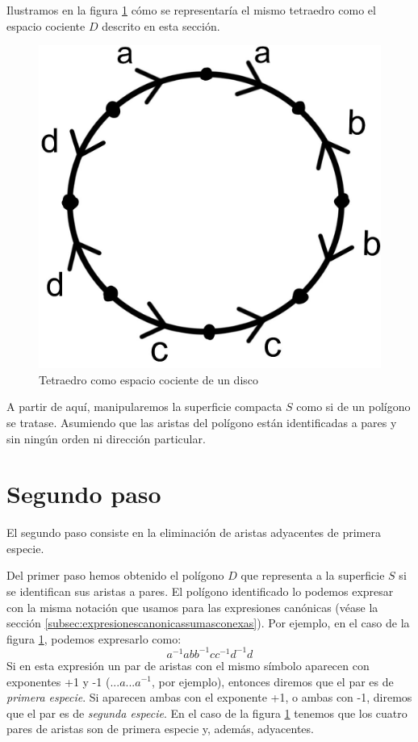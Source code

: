 \documentclass[a4paper,11pt,spanish, twoside, leqno]{tfg-uam}
\theoremstyle{definition}
\begin{document}
Ilustramos en la figura \ref{fig:d} cómo se representaría el mismo tetraedro como el espacio cociente $D$ descrito en esta sección.

\begin{figure}[h!]
	\centering
	\includegraphics[width=0.3\linewidth]{imagenes/d.jpeg}
	\caption{Tetraedro como espacio cociente de un disco}
	\label{fig:d}
\end{figure}

A partir de aquí, manipularemos la superficie compacta $S$ como si de un polígono se tratase. Asumiendo que las aristas del polígono están identificadas a pares y sin ningún orden ni dirección particular.


\section{Segundo paso}

El segundo paso consiste en la eliminación de aristas adyacentes de primera especie.

Del primer paso hemos obtenido el polígono $D$ que representa a la superficie $S$ si se identifican sus aristas a pares. El polígono identificado lo podemos expresar con la misma notación que usamos para las expresiones canónicas (véase la sección \ref{subsec:expresionescanonicassumasconexas}). Por ejemplo, en el caso de la figura \ref{fig:d}, podemos expresarlo como:
\[ a^{-1}abb^{-1}cc^{-1}d^{-1}d \]
Si en esta expresión un par de aristas con el mismo símbolo aparecen  con exponentes +1 y -1 ($...a...a^{-1}$, por ejemplo), entonces diremos que el par es de \textit{primera especie}. Si aparecen ambas con el exponente +1, o ambas con -1, diremos que el par es de \textit{segunda especie}. En el caso de la figura \ref{fig:d} tenemos que los cuatro pares de aristas son de primera especie y, además, adyacentes.
\end{document}

